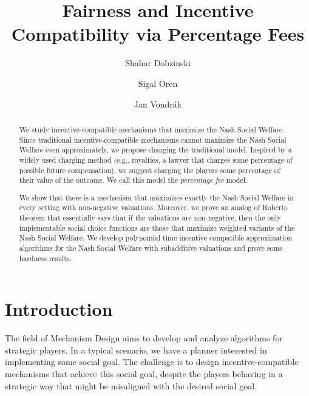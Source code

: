\documentclass{article}
\author{Shahar Dobzinski \and Sigal Oren \and Jan Vondrák}\date{}
\title{Fairness and Incentive Compatibility via Percentage Fees}
\begin{document}


\maketitle

\begin{abstract}
We study incentive-compatible mechanisms that maximize the Nash Social Welfare. Since traditional incentive-compatible mechanisms cannot maximize the Nash Social Welfare even approximately, we propose changing the traditional model. Inspired by a widely used charging method (e.g., royalties, a lawyer that charges some percentage of possible future compensation), we suggest charging the players some percentage of their value of the outcome. We call this model the \emph{percentage fee} model.

We show that there is a mechanism that maximizes exactly the Nash Social Welfare in every setting with non-negative valuations. Moreover, we prove an analog of Roberts theorem that essentially says that if the valuations are non-negative, then the only implementable social choice functions are those that maximize weighted variants of the Nash Social Welfare. We develop polynomial time incentive compatible approximation algorithms for the Nash Social Welfare with subadditive valuations and prove some hardness results. 
\end{abstract}

\section{Introduction}

The field of Mechanism Design aims to develop and analyze algorithms for strategic players. In a typical scenario, we have a planner interested in implementing some social goal. The challenge is to design incentive-compatible mechanisms that achieve this social goal, despite the players behaving in a strategic way that might be misaligned with the desired social goal.
\end{document}
